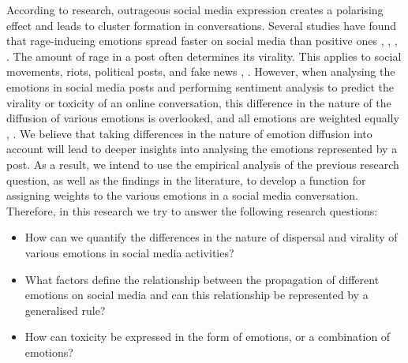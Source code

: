 According to research, outrageous social media expression creates a polarising effect and leads to cluster formation in conversations. Several studies have found that rage-inducing emotions spread faster on social media than positive ones \cite{bacaksizlar2019understanding}, \cite{steinert2022emotions}, \cite{chuai2020anger}, \cite{yi2022depicting}. The amount of rage in a post often determines its virality. This applies to social movements, riots, political posts, and fake news \cite{solovev2022moral}, \cite{mirbabaie2021development}. However, when analysing the emotions in social media posts and performing sentiment analysis to predict the virality or toxicity of an online conversation, this difference in the nature of the diffusion of various emotions is overlooked, and all emotions are weighted equally \cite{yue2019survey}, \cite{nemes2021social}. We believe that taking differences in the nature of emotion diffusion into account will lead to deeper insights into analysing the emotions represented by a post. As a result, we intend to use the empirical analysis of the previous research question, as well as the findings in the literature, to develop a function for assigning weights to the various emotions in a social media conversation. Therefore, in this research we try to answer the following research questions:
\begin{itemize}
    \item How can we quantify the differences in the nature of dispersal and virality of various emotions in social media activities?
    \item What factors define the relationship between the propagation of different emotions on social media and can this relationship be represented by a generalised rule?
    \item How can toxicity be expressed in the form of emotions, or a combination of emotions?
\end{itemize}
